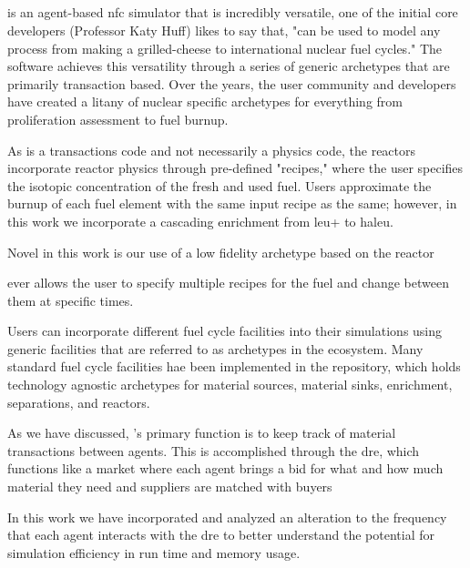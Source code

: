 \subsection{\cyclus}
\cyclus is an agent-based \gls{nfc} simulator that is incredibly
versatile, one of the initial core developers (Professor Katy Huff)
likes to say that, "\cyclus can be used to model any process from making
a grilled-cheese to international nuclear fuel cycles." The software
achieves this versatility through a series of generic archetypes that are
primarily transaction based. Over the years, the user community and
developers have created a litany of nuclear specific archetypes for
everything from proliferation assessment to fuel burnup.

As \cyclus is a transactions code and not necessarily a physics code,
the reactors incorporate reactor physics through pre-defined "recipes,"
where the user specifies the isotopic concentration of the fresh and
used fuel. Users approximate the burnup of each fuel element with the
same input recipe as the same; however, in this work we incorporate a
cascading enrichment from \gls{leu+} to \gls{haleu}.

Novel in this work is our use of a low fidelity archetype based on the
\cycamore reactor %

\gls{ever} allows the user to specify multiple recipes for the fuel and
change between them at specific times.

Users can incorporate different fuel cycle facilities into their \cyclus
simulations using generic facilities that are referred to as archetypes
in the \cyclus ecosystem. Many standard fuel cycle facilities hae been
implemented in the \cycamore repository, which holds technology agnostic
archetypes for material sources, material sinks, enrichment,
separations, and reactors.

As we have discussed, \cyclus's primary function is to keep track of
material transactions between agents. This is accomplished through the
\gls{dre}, which functions like a market where each agent brings a bid
for what and how much material they need and suppliers are matched with
buyers %

In this work we have incorporated and analyzed an alteration to the
frequency that each agent interacts with the \gls{dre} to better
understand the potential for simulation efficiency in run time and
memory usage.

